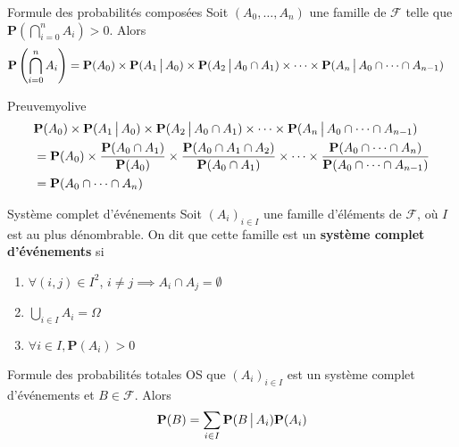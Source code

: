     \begin{prop}{Formule des probabilités composées}{}
        Soit $(A_0, \ldots, A_n)$ une famille de $\mathcal{F}$ telle que $\mathbf{P}\left(\bigcap_{i =0}^n A_i\right) > 0$. Alors 
        \begin{align*}
            \mathbf{P}\left(\bigcap_{i =0}^n A_i\right)
            &= \mathbf{P}(A_0) \times \mathbf{P}(A_1 \, \big| \, A_0) \times \mathbf{P}(A_2 \, \big| \, A_0 \cap A_1) \times \cdots \times \mathbf{P}(A_n \, \big| \, A_0 \cap \cdots \cap A_{n - 1})
        \end{align*}
    \end{prop}

    \begin{demo}{Preuve}{myolive}
        \begin{align*}
            &\mathbf{P}(A_0) \times \mathbf{P}(A_1 \, \big| \, A_0) \times \mathbf{P}(A_2 \, \big| \, A_0 \cap A_1) \times \cdots \times \mathbf{P}(A_n \, \big| \, A_0 \cap \cdots \cap A_{n - 1}) \\
            &= \mathbf{P}(A_0) \times \frac{\mathbf{P}(A_0 \cap A_1)}{\mathbf{P}(A_0)} \times \frac{\mathbf{P}(A_0 \cap A_1 \cap A_2)}{\mathbf{P}(A_0 \cap A_1)} \times \cdots \times \frac{\mathbf{P}(A_0 \cap \cdots \cap A_n)}{\mathbf{P}(A_0 \cap \cdots \cap A_{n-1})} \\
            &= \mathbf{P}(A_0 \cap \cdots \cap A_n)
        \end{align*}
    \end{demo}

    \begin{defi}{Système complet d’événements}{}
        Soit $(A_i)_{i \in I}$ une famille d’éléments de $\mathcal{F}$, où $I$ est au plus dénombrable. On dit que cette famille est un \textbf{système complet d’événements} si 
        \begin{enumerate}
            \item $\forall (i,j) \in I^2$, $i \neq j \implies A_i \cap A_j = \emptyset$
            \item $\bigcup_{i \in I} A_i = \Omega$
            \item $\forall i \in I, \mathbf{P}(A_i) > 0$
        \end{enumerate}
    \end{defi}

    \begin{prop}{Formule des probabilités totales}{}
        OS que $(A_i)_{i \in I}$ est un système complet d’événements et $B \in \mathcal{F}$. Alors 
        \[ \mathbf{P}(B) = \sum_{i \in I} \mathbf{P}(B \, \big| \, A_i) \mathbf{P}(A_i) \]    
    \end{prop}

